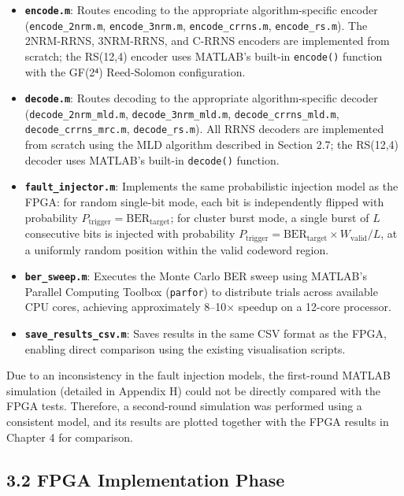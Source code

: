 \begin{itemize}
\tightlist
\item
  \textbf{\texttt{encode.m}}: Routes encoding to the appropriate
  algorithm-specific encoder (\texttt{encode\_2nrm.m},
  \texttt{encode\_3nrm.m}, \texttt{encode\_crrns.m},
  \texttt{encode\_rs.m}). The 2NRM-RRNS, 3NRM-RRNS, and C-RRNS encoders
  are implemented from scratch; the RS(12,4) encoder uses MATLAB's
  built-in \texttt{encode()} function with the GF(2⁴) Reed-Solomon
  configuration.
\item
  \textbf{\texttt{decode.m}}: Routes decoding to the appropriate
  algorithm-specific decoder (\texttt{decode\_2nrm\_mld.m},
  \texttt{decode\_3nrm\_mld.m}, \texttt{decode\_crrns\_mld.m},
  \texttt{decode\_crrns\_mrc.m}, \texttt{decode\_rs.m}). All RRNS
  decoders are implemented from scratch using the MLD algorithm
  described in Section 2.7; the RS(12,4) decoder uses MATLAB's built-in
  \texttt{decode()} function.
\item
  \textbf{\texttt{fault\_injector.m}}: Implements the same probabilistic
  injection model as the FPGA: for random single-bit mode, each bit is
  independently flipped with probability
  \(P_{\text{trigger}} = \text{BER}_{\text{target}}\); for cluster burst
  mode, a single burst of \(L\) consecutive bits is injected with
  probability
  \(P_{\text{trigger}} = \text{BER}_{\text{target}} \times W_{\text{valid}} / L\),
  at a uniformly random position within the valid codeword region.
\item
  \textbf{\texttt{ber\_sweep.m}}: Executes the Monte Carlo BER sweep
  using MATLAB's Parallel Computing Toolbox (\texttt{parfor}) to
  distribute trials across available CPU cores, achieving approximately
  8--10× speedup on a 12-core processor.
\item
  \textbf{\texttt{save\_results\_csv.m}}: Saves results in the same CSV
  format as the FPGA, enabling direct comparison using the existing
  visualisation scripts.
\end{itemize}

Due to an inconsistency in the fault injection models, the first-round
MATLAB simulation (detailed in Appendix H) could not be directly
compared with the FPGA tests. Therefore, a second-round simulation was
performed using a consistent model, and its results are plotted together
with the FPGA results in Chapter 4 for comparison.

\subsection{3.2 FPGA Implementation
Phase}\label{fpga-implementation-phase}

